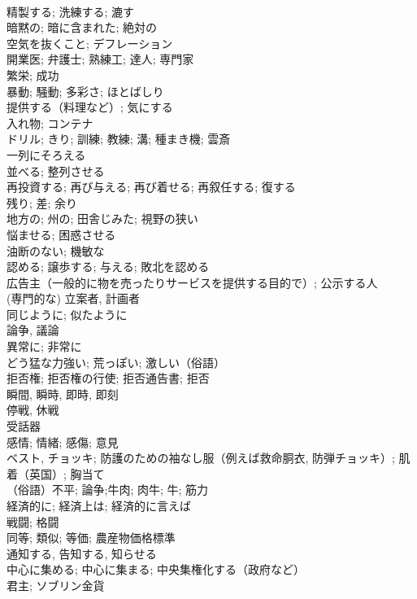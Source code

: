 \documentclass[8pt]{extreport}
\begin{document}
\begin{CJK}{UTF8}{min}
\\	精製する; 洗練する; 漉す	
\\	暗黙の; 暗に含まれた; 絶対の	
\\	空気を抜くこと; デフレーション	
\\	開業医; 弁護士; 熟練工; 達人; 専門家	
\\	繁栄; 成功	
\\	暴動; 騒動; 多彩さ; ほとばしり	
\\	提供する（料理など）; 気にする	
\\	入れ物; コンテナ	
\\	ドリル; きり; 訓練; 教練; 溝; 種まき機; 雲斎	
\\	一列にそろえる 
\\	並べる; 整列させる	
\\	再投資する; 再び与える; 再び着せる; 再叙任する; 復する	
\\	残り; 差; 余り	
\\	地方の; 州の; 田舎じみた; 視野の狭い	
\\	悩ませる; 困惑させる	
\\	油断のない; 機敏な	
\\	認める; 譲歩する; 与える; 敗北を認める	
\\	広告主（一般的に物を売ったりサービスを提供する目的で）; 公示する人	
\\	(専門的な) 立案者, 計画者	
\\	同じように; 似たように	
\\	論争, 議論	
\\	異常に; 非常に	
\\	どう猛な力強い; 荒っぽい; 激しい（俗語）	
\\	拒否権; 拒否権の行使; 拒否通告書; 拒否	
\\	瞬間, 瞬時, 即時, 即刻	
\\	停戦, 休戦	
\\	受話器	
\\	感情; 情緒; 感傷; 意見	
\\	ベスト, チョッキ; 防護のための袖なし服（例えば救命胴衣, 防弾チョッキ）; 肌着（英国）; 胸当て	
\\	（俗語）不平; 論争;牛肉; 肉牛; 牛; 筋力	
\\	経済的に; 経済上は; 経済的に言えば	
\\	戦闘; 格闘	
\\	同等; 類似; 等価; 農産物価格標準	
\\	通知する, 告知する, 知らせる	
\\	中心に集める; 中心に集まる; 中央集権化する（政府など）	
\\	君主; ソブリン金貨	

\end{CJK}
\end{document}
